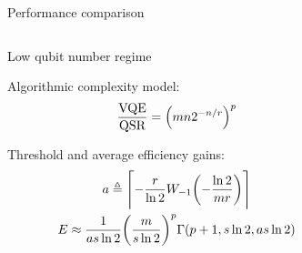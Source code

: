 \documentclass[final]{beamer}
\newlength{\onecolwid}
\newlength{\twocolwid}
\begin{document}
\begin{frame}[t]
\begin{columns}[t]
\begin{column}{\twocolwid}
\begin{alertblock}{Performance comparison}
\end{alertblock}


\begin{columns}[t,totalwidth=\twocolwid] %
\begin{column}{\onecolwid} %


\begin{block}{Low qubit number regime}

  Algorithmic complexity model:
  \begin{gather*}
    \frac{\textnormal{VQE}}{\textnormal{QSR}} = \qty(m n 2^{-n/r})^{p}
  \end{gather*}

  \vspace{1em}

  Threshold and average efficiency gains:
  \begin{gather*}
    a \defeq \ceil*{- \frac{r}{\ln{2}} W_{-1}\qty(-\frac{\ln{2}}{mr})} \\
    E \approx
      \frac{1}{as\ln{2}} \qty(\frac{m}{s\ln{2}})^p
      \Gamma \qty(p+1, s\ln{2}, as\ln{2}) \label{eq:QSR-efficiency}
  \end{gather*}

\end{block}


\end{column} %
\begin{column}{\onecolwid} %



\end{column}
\end{columns}
\end{column}
\end{columns}
\end{frame}
\end{document}
